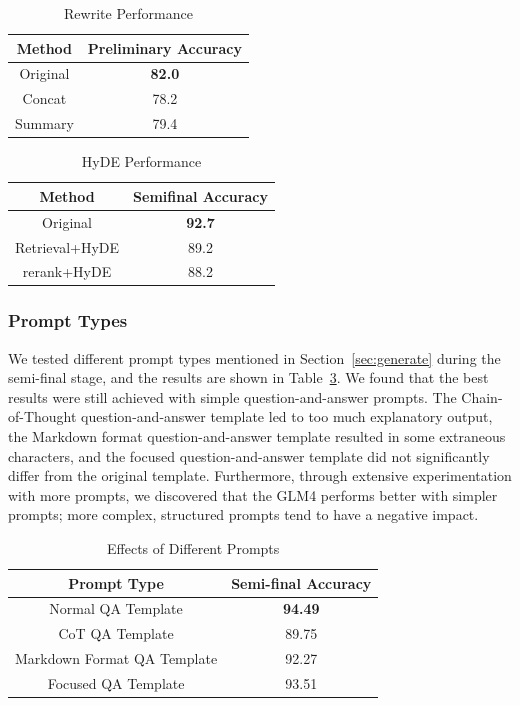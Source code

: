 \documentclass[11pt]{article}
\begin{document}
\begin{table}[]
\small
    \centering
    \begin{tabular}{c|c}
    \toprule
        \textbf{Method} &\textbf{Preliminary Accuracy} \\
        \midrule
        Original & \textbf{82.0} \\
        Concat & 78.2\\
        Summary & 79.4 \\
        \bottomrule
    \end{tabular}
    \caption{Rewrite Performance}
    \label{tab:query_expansion}
\end{table}

\begin{table}[]
\small
    \centering
    \begin{tabular}{c|c}
    \toprule
        \textbf{Method} &\textbf{Semifinal Accuracy} \\
        \midrule
        Original& \textbf{92.7} \\
        Retrieval+HyDE& 89.2\\
        rerank+HyDE& 88.2 \\
        \bottomrule
    \end{tabular}
    \caption{HyDE Performance}
    \label{tab:hyde}
\end{table}

\subsubsection{Prompt Types}
We tested different prompt types mentioned in Section~\ref{sec:generate} during the semi-final stage, and the results are shown in Table~\ref{tab:prompt}. We found that the best results were still achieved with simple question-and-answer prompts. The Chain-of-Thought question-and-answer template led to too much explanatory output, the Markdown format question-and-answer template resulted in some extraneous characters, and the focused question-and-answer template did not significantly differ from the original template. Furthermore, through extensive experimentation with more prompts, we discovered that the GLM4 performs better with simpler prompts; more complex, structured prompts tend to have a negative impact.

\begin{table}[]
\small
    \centering
    \begin{tabular}{c|c}
    \toprule
        \textbf{Prompt Type} & \textbf{Semi-final Accuracy} \\
        \midrule
        Normal QA Template & \textbf{94.49} \\
        CoT QA Template & 89.75 \\
        Markdown Format QA Template & 92.27 \\
        Focused QA Template & 93.51 \\
        \bottomrule
    \end{tabular}
    \caption{Effects of Different Prompts}
    \label{tab:prompt}
\end{table}
\end{document}
